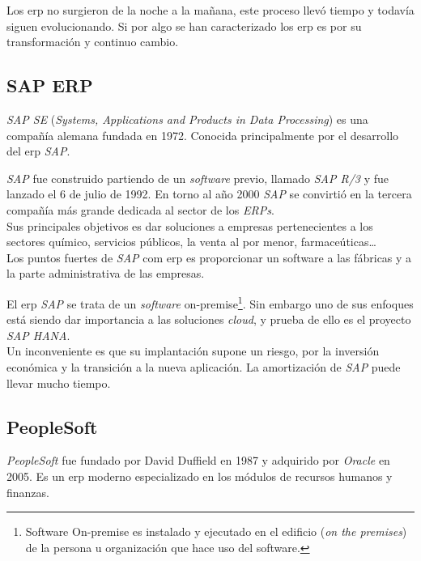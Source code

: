 Los \acrshort{erp} no surgieron de la noche a la mañana, este proceso llevó tiempo y todavía siguen evolucionando. Si por algo se han caracterizado los \acrshort{erp} es por su transformación y continuo cambio.
\cite{hossain_rashid_patrick_2003}
\cite{wiki:erp}
\cite{burgos_2015}

\subsection{SAP ERP}


\textit{SAP SE} (\textit{Systems, Applications and Products in Data Processing}) es una compañía alemana fundada en 1972. Conocida principalmente por el desarrollo del \acrshort{erp} \textit{SAP}.

\textit{SAP} fue construido partiendo de un \textit{software} previo, llamado \textit{SAP R/3} y fue lanzado el 6 de julio de 1992.
En torno al año 2000 \textit{SAP} se convirtió en la tercera compañía más grande dedicada al sector de los \textit{ERPs}.\\

Sus principales objetivos es dar soluciones a empresas pertenecientes a los sectores químico, servicios públicos, la venta al por menor, farmaceúticas\ldots\\

Los puntos fuertes de \textit{SAP} com \acrshort{erp} es proporcionar un software a las fábricas y a la parte administrativa de las empresas.

El \acrshort{erp} \textit{SAP} se trata de un \textit{software} \gls{on-premise}\footnote{Software On-premise es instalado y ejecutado en el edificio (\textit{on the premises}) de la persona u organización que hace uso del software.}.
Sin embargo uno de sus enfoques está siendo dar importancia a las soluciones \textit{cloud}, y prueba de ello es el proyecto \textit{SAP HANA}.\\



Un inconveniente es que su implantación supone un riesgo, por la inversión económica y la transición a la nueva aplicación. La amortización de \textit{SAP} puede llevar mucho tiempo.

\subsection{PeopleSoft}
\textit{PeopleSoft} fue fundado por David Duffield en 1987 y adquirido por \textit{Oracle} en 2005. Es un \acrshort{erp} moderno especializado en los módulos de recursos humanos y finanzas.\\

